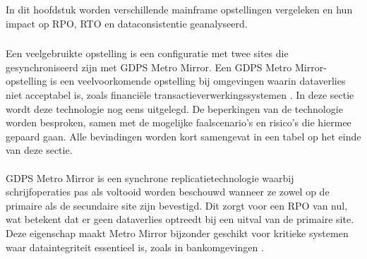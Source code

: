 \chapter{}%
\label{ch:analyse}

\section{}%
\label{sec:architecturale-analyse}

In dit hoofdstuk worden verschillende mainframe opstellingen vergeleken en hun impact op RPO, RTO en dataconsistentie geanalyseerd.

\subsection{}%
\label{sec:twee-synchrone-sites}

Een veelgebruikte opstelling is een configuratie met twee sites die gesynchroniseerd zijn met GDPS Metro Mirror.
Een GDPS Metro Mirror-opstelling is een veelvoorkomende opstelling bij omgevingen waarin dataverlies niet acceptabel is, zoals financiële transactieverwerkingssystemen \autocite{ivanov2023unveiling}.
In deze sectie wordt deze technologie nog eens uitgelegd.
De beperkingen van de technologie worden besproken, samen met de mogelijke faalscenario's en risico's die hiermee gepaard gaan.
Alle bevindingen worden kort samengevat in een tabel op het einde van deze sectie.

\subsubsection{}%
\label{sec:twee-synchrone-sites-werking-metro-mirror}

GDPS Metro Mirror is een synchrone replicatietechnologie waarbij schrijfoperaties pas als voltooid worden beschouwd wanneer ze zowel op de primaire als de secundaire site zijn bevestigd.
Dit zorgt voor een RPO van nul, wat betekent dat er geen dataverlies optreedt bij een uitval van de primaire site.
Deze eigenschap maakt Metro Mirror bijzonder geschikt voor kritieke systemen waar dataintegriteit essentieel is, zoals in bankomgevingen \autocite{gomes_2025_redbooks}.

\subsubsection{}%
\label{sec:twee-synchrone-sites-beperkingen}

